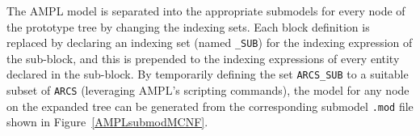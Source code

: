 \documentclass[10pt,a4paper]{report}
\begin{document}
The AMPL model is separated into the appropriate submodels for every node
of the prototype tree by changing the indexing sets.
Each block definition is replaced
by declaring an indexing set (named {\tt *\_SUB}) for the
indexing expression of the sub-block, and this is prepended to the
indexing expressions of every entity declared in the sub-block. By
temporarily defining the set {\tt ARCS\_SUB} to a suitable subset of {\tt ARCS} 
(leveraging AMPL's scripting commands), the
model for any node on the expanded tree can be generated from the
corresponding submodel {\tt *.mod} file shown in Figure~\ref{AMPLsubmodMCNF}.
\end{document}
